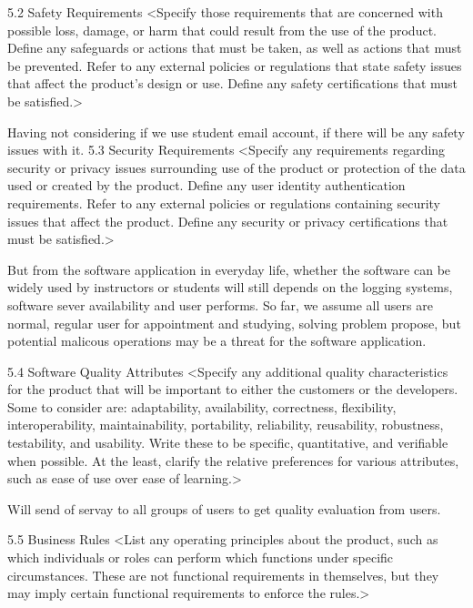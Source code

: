 5.2	Safety Requirements
<Specify those requirements that are concerned with possible loss, damage, or harm that could result from the use of the product. Define any safeguards or actions that must be taken, as well as actions that must be prevented. Refer to any external policies or regulations that state safety issues that affect the product's design or use. Define any safety certifications that must be satisfied.>

Having not considering if we use student email account, if there will be any safety issues with it.
5.3	Security Requirements
<Specify any requirements regarding security or privacy issues surrounding use of the product or protection of the data used or created by the product. Define any user identity authentication requirements. Refer to any external policies or regulations containing security issues that affect the product. Define any security or privacy certifications that must be satisfied.>

But from the software application in everyday life, whether the software can be widely used by instructors or students will still depends on the logging systems, software sever availability and user performs. So far, we assume all users are normal, regular user for appointment and studying, solving problem propose, but potential malicous operations may be a threat for the software application. 

5.4	Software Quality Attributes
<Specify any additional quality characteristics for the product that will be important to either the customers or the developers. Some to consider are: adaptability, availability, correctness, flexibility, interoperability, maintainability, portability, reliability, reusability, robustness, testability, and usability. Write these to be specific, quantitative, and verifiable when possible. At the least, clarify the relative preferences for various attributes, such as ease of use over ease of learning.>

Will send of servay to all groups of users to get quality evaluation from users. 

5.5	Business Rules
<List any operating principles about the product, such as which individuals or roles can perform which functions under specific circumstances. These are not functional requirements in themselves, but they may imply certain functional requirements to enforce the rules.>


